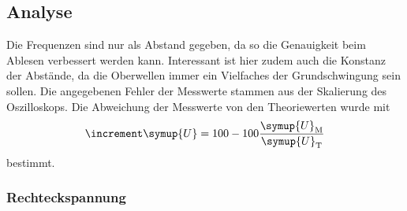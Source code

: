 \subsection{Analyse}

Die Frequenzen sind nur als Abstand gegeben, da so die Genauigkeit beim
Ablesen verbessert werden kann. Interessant ist hier zudem auch die Konstanz
der Abstände, da die Oberwellen immer ein Vielfaches der Grundschwingung sein
sollen.
Die angegebenen Fehler der Messwerte stammen aus der Skalierung des Oszilloskops.
Die Abweichung der Messwerte von den Theoriewerten wurde mit
\begin{equation}
  \increment \symup{U} = 100- 100 \frac{\symup{U}_\text{M}}{\symup{U}_\text{T}}
  \label{eqn:abweichungamplitude}
\end{equation}
bestimmt.

\subsubsection{Rechteckspannung}

